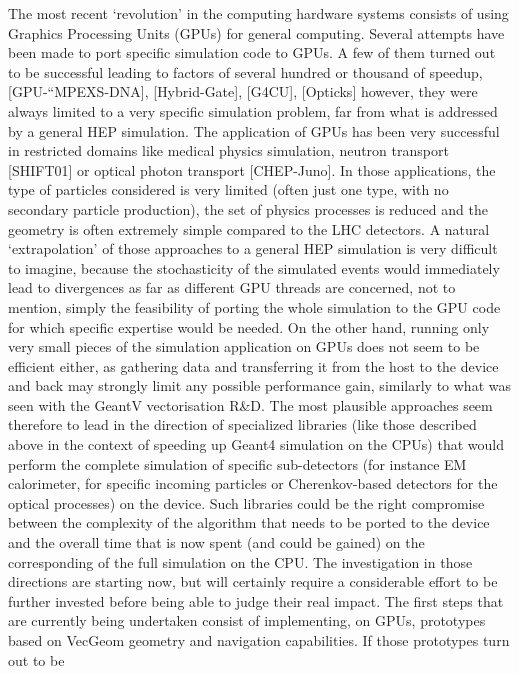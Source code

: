 \documentclass[11pt,a4paper]{article}
\begin{document}
The most recent `revolution' in the computing hardware systems consists
of using Graphics Processing Units (GPUs) for general computing. Several
attempts have been made to port specific simulation code to GPUs. A few
of them turned out to be successful leading to factors of several
hundred or thousand of speedup, {[}GPU-``MPEXS-DNA{]},
{[}Hybrid-Gate{]}, {[}G4CU{]}, {[}Opticks{]} however, they were always
limited to a very specific simulation problem, far from what is
addressed by a general HEP simulation. The application of GPUs has been
very successful in restricted domains like medical physics simulation,
neutron transport {[}SHIFT01{]} or optical photon transport
{[}CHEP-Juno{]}. In those applications, the type of particles considered
is very limited (often just one type, with no secondary particle
production), the set of physics processes is reduced and the geometry is
often extremely simple compared to the LHC detectors. A natural
`extrapolation' of those approaches to a general HEP simulation is very
difficult to imagine, because the stochasticity of the simulated events
would immediately lead to divergences as far as different GPU threads
are concerned, not to mention, simply the feasibility of porting the
whole simulation to the GPU code for which specific expertise would be
needed. On the other hand, running only very small pieces of the
simulation application on GPUs does not seem to be efficient either, as
gathering data and transferring it from the host to the device and back
may strongly limit any possible performance gain, similarly to what was
seen with the GeantV vectorisation R\&D. The most plausible approaches
seem therefore to lead in the direction of specialized libraries (like
those described above in the context of speeding up Geant4 simulation on
the CPUs) that would perform the complete simulation of specific
sub-detectors (for instance EM calorimeter, for specific incoming
particles or Cherenkov-based detectors for the optical processes) on the
device. Such libraries could be the right compromise between the
complexity of the algorithm that needs to be ported to the device and
the overall time that is now spent (and could be gained) on the
corresponding of the full simulation on the CPU. The investigation in
those directions are starting now, but will certainly require a
considerable effort to be further invested before being able to judge
their real impact. The first steps that are currently being undertaken
consist of implementing, on GPUs, prototypes based on VecGeom geometry
and navigation capabilities. If those prototypes turn out to be
\end{document}
